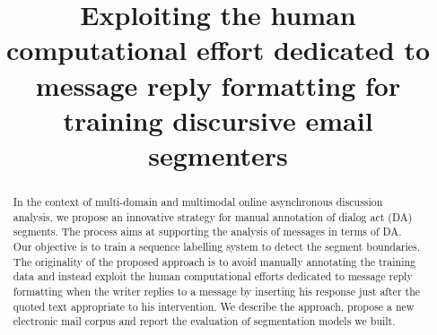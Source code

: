 \documentclass[11pt]{article}
\title{Exploiting the human computational effort dedicated to message reply formatting for training discursive email segmenters} %
\date{}
\author{}
\begin{document}
\maketitle

\begin{abstract}
In the context of multi-domain and multimodal online asynchronous discussion analysis, we propose an innovative strategy for manual annotation of dialog act (DA) segments. The process aims at supporting the analysis of messages in terms of DA.
Our objective is to train a sequence labelling system to detect the segment boundaries. %
The originality of the proposed approach is to avoid manually annotating the training data and instead exploit the human computational efforts dedicated to message reply formatting %
when the writer replies to a message by inserting his response just after the quoted text appropriate to his intervention.
%
We describe the approach, propose a new electronic mail corpus %
and report the evaluation of segmentation models we built.
\end{abstract}





%
% 
\blfootnote{
    \hspace{-0.65cm}  %
}
\end{document}
